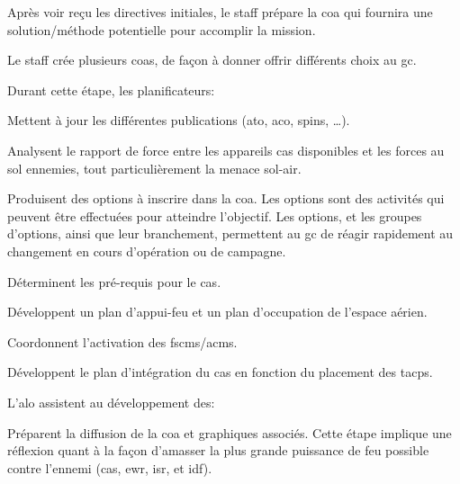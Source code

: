 Après voir reçu les directives initiales, le staff prépare la \gls{coa} qui fournira une solution/méthode potentielle pour accomplir la mission.

Le staff crée plusieurs \glspl{coa}, de façon à donner offrir différents choix au \gls{gc}.

Durant cette étape, les planificateurs:

\begin{e1}
	\item Mettent à jour les différentes publications (\gls{ato}, \gls{aco}, \gls{spins}, \ldots{}).
	\item Analysent le rapport de force entre les appareils \gls{cas} disponibles et les forces au sol ennemies, tout particulièrement la menace sol-air.
	\item Produisent des options à inscrire dans la \gls{coa}. Les options sont des activités qui peuvent être effectuées pour atteindre l'objectif. Les options, et les groupes d'options, ainsi que leur branchement, permettent au \gls{gc} de réagir rapidement au changement en cours d'opération ou de campagne.
	\item Déterminent les pré-requis pour le \gls{cas}.
	\item Développent un plan d'appui-feu et un plan d'occupation de l'espace aérien.
	\item Coordonnent l'activation des \glspl{fscm}/\glspl{acm}.
	\item Développent le plan d'intégration du \gls{cas} en fonction du placement des \glspl{tacp}.
	\item L'\gls{alo} assistent au développement des:
	\item Préparent la diffusion de la \gls{coa} et graphiques associés. Cette étape implique une réflexion quant à la façon d'amasser la plus grande puissance de feu possible contre l'ennemi (\gls{cas}, \gls{ewr}, \gls{isr}, et \gls{idf}).
	

\end{e1}

